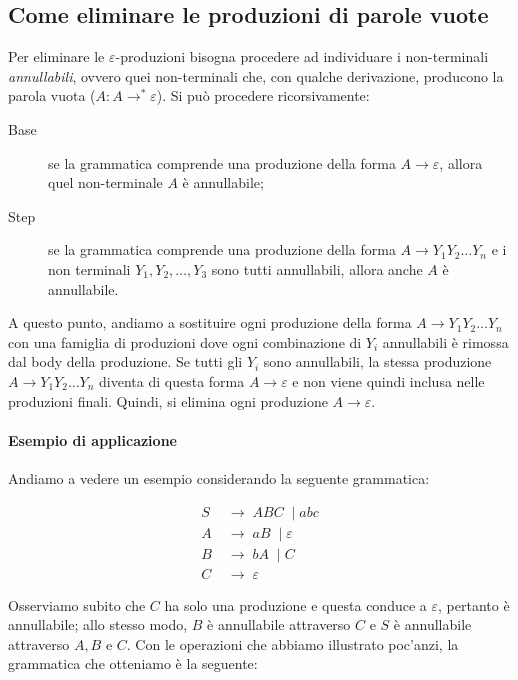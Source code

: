 \documentclass[class=book, crop=false, oneside, 12pt]{standalone}
\begin{document}
\subsection{Come eliminare le produzioni di parole vuote}
Per eliminare le \(\varepsilon\)-produzioni bisogna procedere ad individuare i non-terminali \emph{annullabili}, ovvero quei non-terminali che, con qualche derivazione, producono la parola vuota (\(A : A \rightarrow^\ast \varepsilon\)). Si può procedere ricorsivamente:
\begin{description}
  \item[Base] se la grammatica comprende una produzione della forma \(A \rightarrow \varepsilon\), allora quel non-terminale \(A\) è annullabile;
  \item[Step] se la grammatica comprende una produzione della forma \(A \rightarrow Y_1Y_2 \ldots Y_n\) e i non terminali \(Y_1, Y_2, \ldots, Y_3\) sono tutti annullabili, allora anche \(A\) è annullabile. 
\end{description}
A questo punto, andiamo a sostituire ogni produzione della forma \(A \rightarrow Y_1Y_2 \ldots Y_n\) con una famiglia di produzioni dove ogni combinazione di \(Y_i\) annullabili è rimossa dal body della produzione. Se tutti gli \(Y_i\) sono annullabili, la stessa produzione \(A \rightarrow Y_1Y_2 \ldots Y_n\) diventa di questa forma \(A \rightarrow \varepsilon\) e non viene quindi inclusa nelle produzioni finali. Quindi, si elimina ogni produzione \(A \rightarrow \varepsilon\).

\paragraph{Esempio di applicazione}
Andiamo a vedere un esempio considerando la seguente grammatica:
%

\begin{align*}
  S\; & \to\; ABC\; \mid abc \\
  A\; & \to\; aB\; \mid \varepsilon \\
  B\; & \to\; bA\; \mid C \\
  C\; & \to\; \varepsilon
\end{align*}

Osserviamo subito che \(C\) ha solo una produzione e questa conduce a \(\varepsilon\), pertanto è annullabile; allo stesso modo, \(B\) è annullabile attraverso \(C\) e \(S\) è annullabile attraverso \(A, B\) e \(C\). Con le operazioni che abbiamo illustrato poc'anzi, la grammatica che otteniamo è la seguente:
\end{document}
